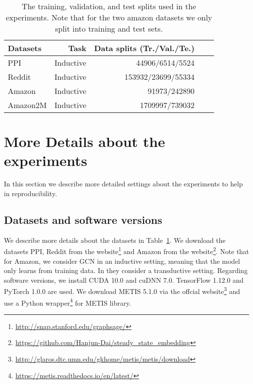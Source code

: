 \documentclass[sigconf]{acmart}
\begin{document}



\clearpage

\clearpage
\begin{table}
\centering
      \caption{The training, validation, and test splits used in the experiments. Note that for the two amazon datasets we only split into training and test sets.}
      \label{tab:parameter2}
    \begin{tabular}{|l|r|r|r|r|}
    \hline
    Datasets & Task & Data splits (Tr./Val./Te.) \\
     \hline
     PPI  & Inductive & 44906/6514/5524 \\
     \hline
     Reddit  & Inductive & 153932/23699/55334 \\
     \hline
     Amazon & Inductive & 91973/242890 \\
     \hline
  Amazon2M  & Inductive & 1709997/739032 \\
  \hline
    \end{tabular}
  \end{table}

\section{More Details about the experiments}
\label{sec:more-details}
In this section we describe more detailed settings about the experiments to help in reproducibility.

\subsection{Datasets and software versions}

We describe more details about the datasets in Table~\ref{tab:parameter2}.
We download the datasets PPI, Reddit from the website\footnote{\url{http://snap.stanford.edu/graphsage/}} and Amazon from the website\footnote{\url{https://github.com/Hanjun-Dai/steady_state_embedding}}.
Note that for Amazon, we consider GCN in an inductive setting, meaning that the model only learns from training data. In \cite{dai2018learning} they consider a transductive setting.
Regarding software versions, we install CUDA 10.0 and cuDNN 7.0.
TensorFlow 1.12.0 and PyTorch 1.0.0 are used.
We download METIS 5.1.0 via the offcial website\footnote{\url{http://glaros.dtc.umn.edu/gkhome/metis/metis/download}} and use a Python wrapper\footnote{\url{https://metis.readthedocs.io/en/latest/}} for METIS library.
\end{document}
